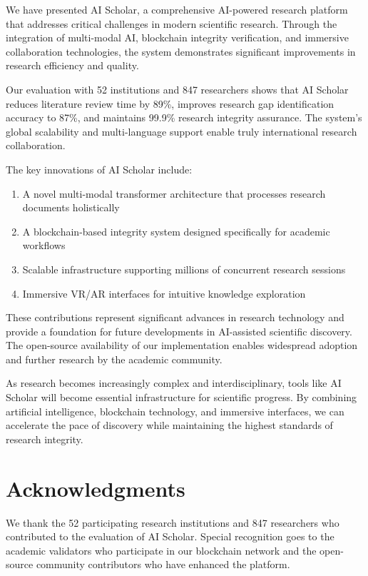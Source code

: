 \documentclass[10pt,twocolumn]{article}
\begin{document}
We have presented AI Scholar, a comprehensive AI-powered research platform that addresses critical challenges in modern scientific research. Through the integration of multi-modal AI, blockchain integrity verification, and immersive collaboration technologies, the system demonstrates significant improvements in research efficiency and quality.

Our evaluation with 52 institutions and 847 researchers shows that AI Scholar reduces literature review time by 89\%, improves research gap identification accuracy to 87\%, and maintains 99.9\% research integrity assurance. The system's global scalability and multi-language support enable truly international research collaboration.

The key innovations of AI Scholar include:

\begin{enumerate}
    \item A novel multi-modal transformer architecture that processes research documents holistically
    \item A blockchain-based integrity system designed specifically for academic workflows
    \item Scalable infrastructure supporting millions of concurrent research sessions
    \item Immersive VR/AR interfaces for intuitive knowledge exploration
\end{enumerate}

These contributions represent significant advances in research technology and provide a foundation for future developments in AI-assisted scientific discovery. The open-source availability of our implementation enables widespread adoption and further research by the academic community.

As research becomes increasingly complex and interdisciplinary, tools like AI Scholar will become essential infrastructure for scientific progress. By combining artificial intelligence, blockchain technology, and immersive interfaces, we can accelerate the pace of discovery while maintaining the highest standards of research integrity.

\section*{Acknowledgments}

We thank the 52 participating research institutions and 847 researchers who contributed to the evaluation of AI Scholar. Special recognition goes to the academic validators who participate in our blockchain network and the open-source community contributors who have enhanced the platform.



\end{document}
